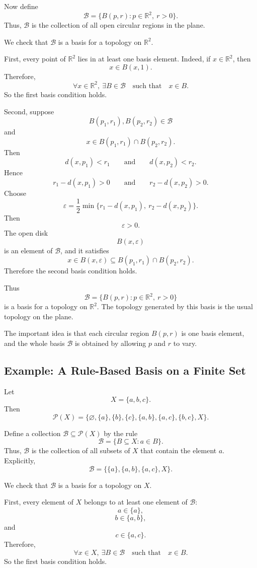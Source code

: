 \documentclass{article}
\begin{document}
	Now define
	\[
	\mathcal B=\{B(p,r):p\in\mathbb R^2,\ r>0\}.
	\]
	Thus, \(\mathcal B\) is the collection of all open circular regions in the plane.
	
	We check that \(\mathcal B\) is a basis for a topology on \(\mathbb R^2\).
	
	First, every point of \(\mathbb R^2\) lies in at least one basis element. Indeed, if \(x\in\mathbb R^2\), then
	\[
	x\in B(x,1).
	\]
	Therefore,
	\[
	\forall x\in\mathbb R^2,\ \exists B\in\mathcal B
	\quad\text{such that}\quad
	x\in B.
	\]
	So the first basis condition holds.
	
	Second, suppose
	\[
	B(p_1,r_1),B(p_2,r_2)\in\mathcal B
	\]
	and
	\[
	x\in B(p_1,r_1)\cap B(p_2,r_2).
	\]
	Then
	\[
	d(x,p_1)<r_1
	\qquad\text{and}\qquad
	d(x,p_2)<r_2.
	\]
	Hence
	\[
	r_1-d(x,p_1)>0
	\qquad\text{and}\qquad
	r_2-d(x,p_2)>0.
	\]
	Choose
	\[
	\varepsilon
	=
	\frac12
	\min\{r_1-d(x,p_1),\ r_2-d(x,p_2)\}.
	\]
	Then
	\[
	\varepsilon>0.
	\]
	The open disk
	\[
	B(x,\varepsilon)
	\]
	is an element of \(\mathcal B\), and it satisfies
	\[
	x\in B(x,\varepsilon)
	\subseteq
	B(p_1,r_1)\cap B(p_2,r_2).
	\]
	Therefore the second basis condition holds.
	
	Thus
	\[
	\mathcal B=\{B(p,r):p\in\mathbb R^2,\ r>0\}
	\]
	is a basis for a topology on \(\mathbb R^2\). The topology generated by this basis is the usual topology on the plane.
	
	The important idea is that each circular region \(B(p,r)\) is one basis element, and the whole basis \(\mathcal B\) is obtained by allowing \(p\) and \(r\) to vary.
	
	\subsection{Example: A Rule-Based Basis on a Finite Set}
	
	Let
	\[
	X=\{a,b,c\}.
	\]
	Then
	\[
	\mathcal P(X)
	=
	\{\varnothing,\{a\},\{b\},\{c\},
	\{a,b\},\{a,c\},\{b,c\},X\}.
	\]
	
	Define a collection \(\mathcal B\subseteq \mathcal P(X)\) by the rule
	\[
	\mathcal B=\{B\subseteq X:a\in B\}.
	\]
	Thus, \(\mathcal B\) is the collection of all subsets of \(X\) that contain the element \(a\). Explicitly,
	\[
	\mathcal B=\{\{a\},\{a,b\},\{a,c\},X\}.
	\]
	
	We check that \(\mathcal B\) is a basis for a topology on \(X\).
	
	First, every element of \(X\) belongs to at least one element of \(\mathcal B\):
	\[
	a\in\{a\},
	\]
	\[
	b\in\{a,b\},
	\]
	and
	\[
	c\in\{a,c\}.
	\]
	Therefore,
	\[
	\forall x\in X,\ \exists B\in\mathcal B
	\quad\text{such that}\quad
	x\in B.
	\]
	So the first basis condition holds.
	
\end{document}
